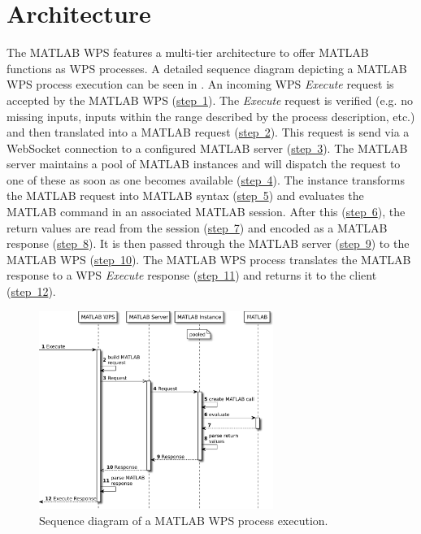 	\section{Architecture}
		The MATLAB WPS features a multi-tier architecture to offer MATLAB functions as \acl{WPS} processes. A detailed sequence diagram depicting a MATLAB WPS process execution can be seen in . An incoming WPS \emph{Execute} request is accepted by the MATLAB WPS (\hyperref[fig:sd:mwps]{step~1}). The \emph{Execute} request is verified (e.g. no missing inputs, inputs within the range described by the process description, etc.) and then translated into a MATLAB request (\hyperref[fig:sd:mwps]{step~2}). This request is send via a WebSocket connection to a configured MATLAB server (\hyperref[fig:sd:mwps]{step~3}). The MATLAB server maintains a pool of MATLAB instances and will dispatch the request to one of these as soon as one becomes available (\hyperref[fig:sd:mwps]{step~4}). The instance transforms the MATLAB request into MATLAB syntax (\hyperref[fig:sd:mwps]{step~5}) and evaluates the MATLAB command in an associated MATLAB session. After this (\hyperref[fig:sd:mwps]{step~6}), the return values are read from the session (\hyperref[fig:sd:mwps]{step~7}) and encoded as a MATLAB response (\hyperref[fig:sd:mwps]{step~8}). It is then passed through the MATLAB server (\hyperref[fig:sd:mwps]{step~9}) to the MATLAB WPS (\hyperref[fig:sd:mwps]{step~10}). The MATLAB WPS process translates the MATLAB response to a WPS \emph{Execute} response (\hyperref[fig:sd:mwps]{step~11}) and returns it to the client (\hyperref[fig:sd:mwps]{step~12}).

		\begin{figure}[!htb]
			\centering
			\includegraphics[width=0.6788732394366197\textwidth]{figures/sequence-diagramm-mwps.pdf}
			\caption{\label{fig:sd:mwps}Sequence diagram of a MATLAB WPS process execution.}
		\end{figure}

